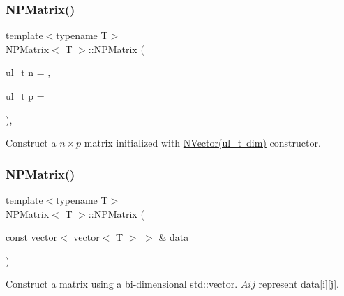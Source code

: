 \subsubsection{\texorpdfstring{NPMatrix()}{NPMatrix()}\hspace{0.1cm}{\footnotesize\ttfamily [1/7]}}
{\footnotesize\ttfamily template$<$typename T$>$ \\
\mbox{\hyperlink{class_n_p_matrix}{N\+P\+Matrix}}$<$ T $>$\+::\mbox{\hyperlink{class_n_p_matrix}{N\+P\+Matrix}} (\begin{DoxyParamCaption}\item[{\mbox{\hyperlink{typedef_8h_a1b140a2034db3f5dfe18a987745df43a}{ul\+\_\+t}}}]{n = {},  }\item[{\mbox{\hyperlink{typedef_8h_a1b140a2034db3f5dfe18a987745df43a}{ul\+\_\+t}}}]{p = {} }\end{DoxyParamCaption})\hspace{0.3cm}{\ttfamily [inline]}, {\ttfamily [explicit]}}



Construct a $ n \times p $ matrix initialized with {\ttfamily \mbox{\hyperlink{class_n_vector_a58eee5f012e4e563d477788051fc7f1d}{N\+Vector(ul\+\_\+t dim)}}} constructor. 

\mbox{\label{class_n_p_matrix_ad5fc4003cdc740be5eed12134929101c}} 
\subsubsection{\texorpdfstring{NPMatrix()}{NPMatrix()}\hspace{0.1cm}{\footnotesize\ttfamily [2/7]}}
{\footnotesize\ttfamily template$<$typename T$>$ \\
\mbox{\hyperlink{class_n_p_matrix}{N\+P\+Matrix}}$<$ T $>$\+::\mbox{\hyperlink{class_n_p_matrix}{N\+P\+Matrix}} (\begin{DoxyParamCaption}\item[{const vector$<$ vector$<$ T $>$ $>$ \&}]{data }\end{DoxyParamCaption})\hspace{0.3cm}{\ttfamily [inline]}}



Construct a matrix using a bi-\/dimensional \textquotesingle{}std\+::vector\textquotesingle{}. $ Aij $ represent {\ttfamily data\mbox{[}i\mbox{]}\mbox{[}j\mbox{]}}. 


